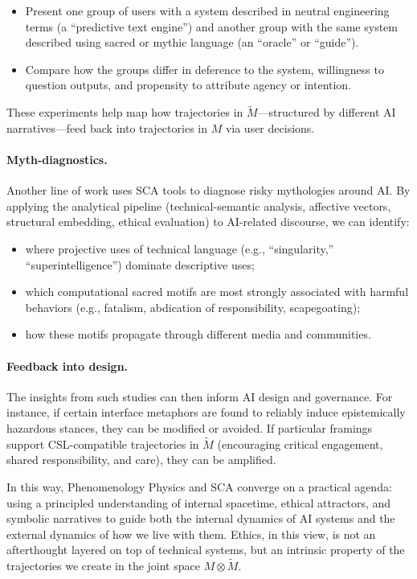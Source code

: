 \documentclass[12]{amsart}
\theoremstyle{plain}
\begin{document}
\begin{itemize}
  \item Present one group of users with a system described in neutral engineering terms (a ``predictive text engine'') and another group with the same system described using sacred or mythic language (an ``oracle'' or ``guide'').
  \item Compare how the groups differ in deference to the system, willingness to question outputs, and propensity to attribute agency or intention.
\end{itemize}

These experiments help map how trajectories in $\tilde M$---structured by different AI narratives---feed back into trajectories in $M$ via user decisions.

\paragraph{Myth-diagnostics.} Another line of work uses SCA tools to diagnose risky mythologies around AI. By applying the analytical pipeline (technical-semantic analysis, affective vectors, structural embedding, ethical evaluation) to AI-related discourse, we can identify:

\begin{itemize}
  \item where projective uses of technical language (e.g., ``singularity,'' ``superintelligence'') dominate descriptive uses;
  \item which computational sacred motifs are most strongly associated with harmful behaviors (e.g., fatalism, abdication of responsibility, scapegoating);
  \item how these motifs propagate through different media and communities.
\end{itemize}

\paragraph{Feedback into design.} The insights from such studies can then inform AI design and governance. For instance, if certain interface metaphors are found to reliably induce epistemically hazardous stances, they can be modified or avoided. If particular framings support CSL-compatible trajectories in $\tilde M$ (encouraging critical engagement, shared responsibility, and care), they can be amplified.

In this way, Phenomenology Physics and SCA converge on a practical agenda: using a principled understanding of internal spacetime, ethical attractors, and symbolic narratives to guide both the internal dynamics of AI systems and the external dynamics of how we live with them. Ethics, in this view, is not an afterthought layered on top of technical systems, but an intrinsic property of the trajectories we create in the joint space $M \otimes \tilde M$.
\end{document}
